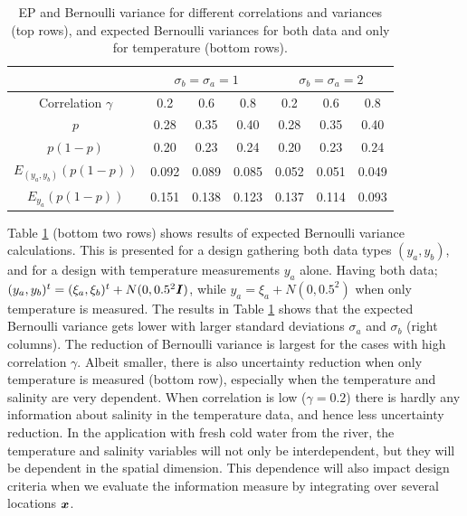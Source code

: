 \documentclass[aoas]{imsart}
\newcommand{\kcomment}[1]{{\color{red}{\{KR: #1\}}}}
\newcommand{\kc}{\kcomment}
\begin{document}
\begin{table}[!h] \centering \caption{EP and Bernoulli variance for
    different correlations and variances (top rows), and expected
    Bernoulli variances for both data \kc{Do you mean an update of the
      data?} and only for temperature (bottom
    rows).}
  \begin{tabular}{c|ccc|ccc}
 &\multicolumn{3}{c}{$\sigma_b=\sigma_a=1$} & \multicolumn{3}{c}{$\sigma_b=\sigma_a=2$} \\
\hline
Correlation $\gamma$ & 0.2 & 0.6 & 0.8 & 0.2 & 0.6 & 0.8 \\
\hline
$p$ & 0.28 & 0.35 & 0.40 & 0.28 & 0.35 & 0.40 \\ 
$p(1-p)$ & 0.20 & 0.23 & 0.24 & 0.20 & 0.23 & 0.24 \\ 
$E_{(y_a,y_b)}(p (1-p))$ & 0.092 & 0.089 & 0.085 & 0.052 & 0.051 & 0.049 \\ 
$E_{y_a}(p (1-p))$ & 0.151 & 0.138 & 0.123 & 0.137 & 0.114 & 0.093 \\ 
\hline
\end{tabular}
\label{tab:sim_rhoab}
\end{table}

Table \ref{tab:sim_rhoab} (bottom two rows) shows results of expected Bernoulli variance calculations. This is presented for a design gathering both data types $(y_a,y_b)$, and for a design with temperature measurements $y_a$ alone. Having both data; $(y_a,y_b)^t=(\xi_a,\xi_b)^t+N(0,0.5^2{\boldsymbol I})$, while $y_a=\xi_a+N(0,0.5^2)$ when only temperature is measured.
The results in Table \ref{tab:sim_rhoab} shows that 
the expected Bernoulli variance gets lower with larger standard deviations $\sigma_a$ and $\sigma_b$ (right columns). The reduction of Bernoulli variance is largest for the cases with high correlation $\gamma$. Albeit smaller, there is also uncertainty reduction when only temperature is measured (bottom row), especially when the temperature and salinity are very dependent. When correlation is low ($\gamma=0.2$) there is hardly any information about salinity in the temperature data, and hence less uncertainty reduction. In the application with fresh cold water from the river, the temperature and salinity variables will not only be interdependent, but they will be dependent in the spatial dimension. This dependence will also impact design criteria when we evaluate the information measure by integrating over several locations ${\boldsymbol x}$. 

\end{document}

